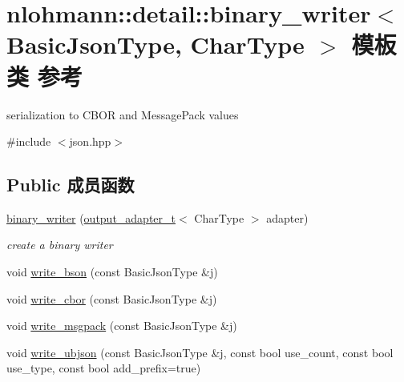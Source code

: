 \hypertarget{classnlohmann_1_1detail_1_1binary__writer}{}\section{nlohmann\+::detail\+::binary\+\_\+writer$<$ Basic\+Json\+Type, Char\+Type $>$ 模板类 参考}
\label{classnlohmann_1_1detail_1_1binary__writer}


serialization to C\+B\+OR and Message\+Pack values  




{\ttfamily \#include $<$json.\+hpp$>$}

\subsection*{Public 成员函数}
\begin{DoxyCompactItemize}
\item 
\mbox{\hyperlink{classnlohmann_1_1detail_1_1binary__writer_a373289af95a946c19bb4a58a5df71a78}{binary\+\_\+writer}} (\mbox{\hyperlink{namespacenlohmann_1_1detail_a9b680ddfb58f27eb53a67229447fc556}{output\+\_\+adapter\+\_\+t}}$<$ Char\+Type $>$ adapter)
\begin{DoxyCompactList}\small\item\em create a binary writer \end{DoxyCompactList}\item 
void \mbox{\hyperlink{classnlohmann_1_1detail_1_1binary__writer_a9ffc566db5219b473762462234b47db9}{write\+\_\+bson}} (const Basic\+Json\+Type \&j)
\item 
void \mbox{\hyperlink{classnlohmann_1_1detail_1_1binary__writer_aa0ab8d27fd88a33a2f801413ac4c7fbc}{write\+\_\+cbor}} (const Basic\+Json\+Type \&j)
\item 
void \mbox{\hyperlink{classnlohmann_1_1detail_1_1binary__writer_ae4e0852b64102ce4b07d99f08f828b7c}{write\+\_\+msgpack}} (const Basic\+Json\+Type \&j)
\item 
void \mbox{\hyperlink{classnlohmann_1_1detail_1_1binary__writer_a0f6c65053d859269f88eb4ebb0cd7060}{write\+\_\+ubjson}} (const Basic\+Json\+Type \&j, const bool use\+\_\+count, const bool use\+\_\+type, const bool add\+\_\+prefix=true)
\end{DoxyCompactItemize}
